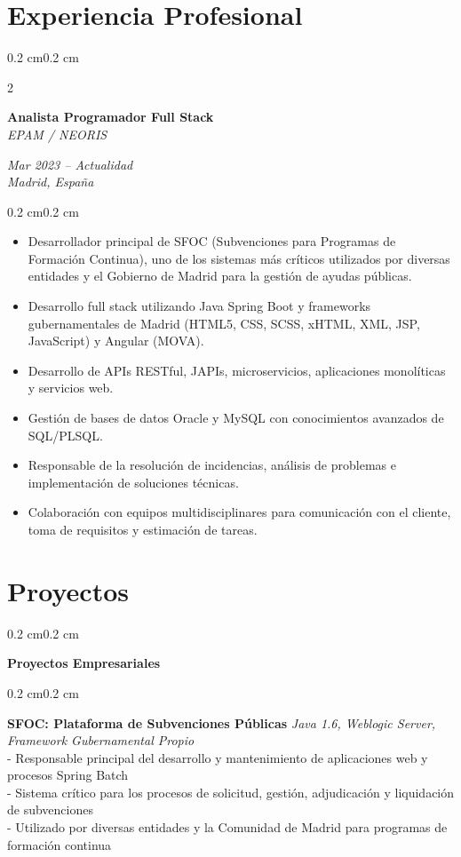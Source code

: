 \documentclass[10pt, letterpaper]{article}
\newenvironment{highlights}{
    \begin{itemize}[
        topsep=0.10 cm,
        parsep=0.10 cm,
        partopsep=0pt,
        itemsep=0pt,
        leftmargin=0.4 cm + 10pt
    ]
}{
    \end{itemize}
}
\newenvironment{onecolentry}{
    \begin{adjustwidth}{0.2 cm}{0.2 cm}
}{
    \end{adjustwidth}
}
\newenvironment{twocolentry}[2][]{
    \onecolentry
    \def\secondColumn{#2}
    \setcolumnwidth{\fill, 4.5 cm}
    \begin{paracol}{2}
}{
    \switchcolumn \raggedleft \secondColumn
    \end{paracol}
    \endonecolentry
}
\begin{document}
    \section{Experiencia Profesional}
    \begin{twocolentry}{\textit{Mar 2023 -- Actualidad}\\\textit{Madrid, España}}
        \textbf{Analista Programador Full Stack} \\
        \textit{EPAM / NEORIS}
    \end{twocolentry}
    \begin{onecolentry}
        \begin{highlights}
            \item Desarrollador principal de SFOC (Subvenciones para Programas de Formación Continua), uno de los sistemas más críticos utilizados por diversas entidades y el Gobierno de Madrid para la gestión de ayudas públicas.
            \item Desarrollo full stack utilizando Java Spring Boot y frameworks gubernamentales de Madrid (HTML5, CSS, SCSS, xHTML, XML, JSP, JavaScript) y Angular (MOVA).
            \item Desarrollo de APIs RESTful, JAPIs, microservicios, aplicaciones monolíticas y servicios web.
            \item Gestión de bases de datos Oracle y MySQL con conocimientos avanzados de SQL/PLSQL.
            \item Responsable de la resolución de incidencias, análisis de problemas e implementación de soluciones técnicas.
            \item Colaboración con equipos multidisciplinares para comunicación con el cliente, toma de requisitos y estimación de tareas.
        \end{highlights}
    \end{onecolentry}

    \section{Proyectos}
    
    \begin{onecolentry}
        \textbf{Proyectos Empresariales}
    \end{onecolentry}

    \begin{onecolentry}
        \textbf{SFOC: Plataforma de Subvenciones Públicas} \hfill \textit{Java 1.6, Weblogic Server, Framework Gubernamental Propio} \\
        - Responsable principal del desarrollo y mantenimiento de aplicaciones web y procesos Spring Batch \\
        - Sistema crítico para los procesos de solicitud, gestión, adjudicación y liquidación de subvenciones \\
        - Utilizado por diversas entidades y la Comunidad de Madrid para programas de formación continua
    \end{onecolentry}
    
\end{document}

